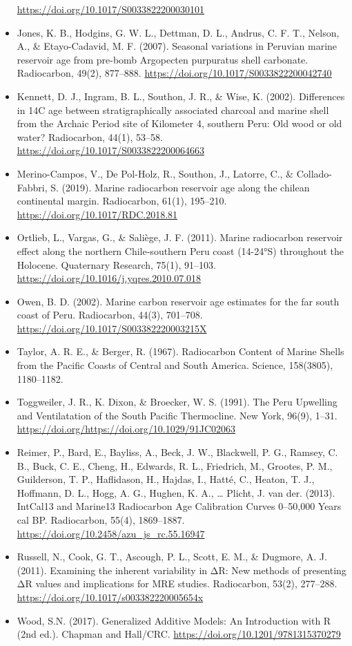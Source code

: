 \documentclass[
]{article}
\begin{document}
\begin{itemize}
  \url{https://doi.org/10.1017/S0033822200030101}
\item
  Jones, K. B., Hodgins, G. W. L., Dettman, D. L., Andrus, C. F. T.,
  Nelson, A., \& Etayo-Cadavid, M. F. (2007). Seasonal variations in
  Peruvian marine reservoir age from pre-bomb Argopecten purpuratus
  shell carbonate. Radiocarbon, 49(2), 877--888.
  \url{https://doi.org/10.1017/S0033822200042740}
\item
  Kennett, D. J., Ingram, B. L., Southon, J. R., \& Wise, K. (2002).
  Differences in 14C age between stratigraphically associated charcoal
  and marine shell from the Archaic Period site of Kilometer 4, southern
  Peru: Old wood or old water? Radiocarbon, 44(1), 53--58.
  \url{https://doi.org/10.1017/S0033822200064663}
\item
  Merino-Campos, V., De Pol-Holz, R., Southon, J., Latorre, C., \&
  Collado-Fabbri, S. (2019). Marine radiocarbon reservoir age along the
  chilean continental margin. Radiocarbon, 61(1), 195--210.
  \url{https://doi.org/10.1017/RDC.2018.81}
\item
  Ortlieb, L., Vargas, G., \& Saliège, J. F. (2011). Marine radiocarbon
  reservoir effect along the northern Chile-southern Peru coast
  (14-24°S) throughout the Holocene. Quaternary Research, 75(1),
  91--103. \url{https://doi.org/10.1016/j.yqres.2010.07.018}
\item
  Owen, B. D. (2002). Marine carbon reservoir age estimates for the far
  south coast of Peru. Radiocarbon, 44(3), 701--708.
  \url{https://doi.org/10.1017/S003382220003215X}
\item
  Taylor, A. R. E., \& Berger, R. (1967). Radiocarbon Content of Marine
  Shells from the Pacific Coasts of Central and South America. Science,
  158(3805), 1180--1182.
\item
  Toggweiler, J. R., K. Dixon, \& Broecker, W. S. (1991). The Peru
  Upwelling and Ventilatation of the South Pacific Thermocline. New
  York, 96(9), 1--31.
  \url{https://doi.org/https://doi.org/10.1029/91JC02063}
\item
  Reimer, P., Bard, E., Bayliss, A., Beck, J. W., Blackwell, P. G.,
  Ramsey, C. B., Buck, C. E., Cheng, H., Edwards, R. L., Friedrich, M.,
  Grootes, P. M., Guilderson, T. P., Haflidason, H., Hajdas, I., Hatté,
  C., Heaton, T. J., Hoffmann, D. L., Hogg, A. G., Hughen, K. A.,
  \ldots{} Plicht, J. van der. (2013). IntCal13 and Marine13 Radiocarbon
  Age Calibration Curves 0--50,000 Years cal BP. Radiocarbon, 55(4),
  1869--1887. \url{https://doi.org/10.2458/azu_js_rc.55.16947}
\item
  Russell, N., Cook, G. T., Ascough, P. L., Scott, E. M., \& Dugmore, A.
  J. (2011). Examining the inherent variability in ΔR: New methods of
  presenting ΔR values and implications for MRE studies. Radiocarbon,
  53(2), 277--288. \url{https://doi.org/10.1017/s003382220005654x}
\item
  Wood, S.N. (2017). Generalized Additive Models: An Introduction with R
  (2nd ed.). Chapman and Hall/CRC.
  \url{https://doi.org/10.1201/9781315370279}
\end{itemize}
\end{document}
